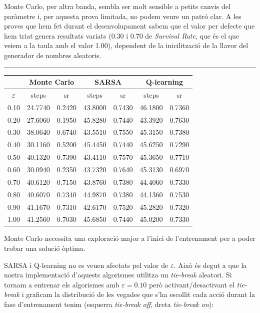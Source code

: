 \documentclass[12pt,a4paper]{report}
\begin{document}
Monte Carlo, per altra banda, sembla ser molt sensible a petits canvis del paràmetre i, per aquesta prova limitada,
no podem veure un patró clar. A les proves que hem fet durant el desenvolupament sabem que el valor per defecte
que hem triat genera resultats variats (0.30 i 0.70 de \textit{Survival Rate}, que és el que veiem a la taula amb el valor 1.00), dependent de la inicilització de la llavor del generador de nombres aleatoris.

\vspace*{10pt}\hrule

\begin{table}[H]
  \centering
  \begin{tabular}{| c | c c | c c | c c |}
    \hline
      & \multicolumn{2}{|c|}{Monte Carlo} & \multicolumn{2}{|c|}{SARSA} & \multicolumn{2}{|c|}{Q-learning} \\
    \hline
    $\varepsilon$ & steps & sr & steps & sr & steps & sr \\
    \hline
    0.10 & 24.7740  & 0.2420 & 43.8000 & 0.7430  & 46.1800 & 0.7360 \\
    0.20 & 27.6060  & 0.1950 & 45.8280 & 0.7440  & 43.3920 & 0.7630 \\
    0.30 & 38.0640  & 0.6740 & 43.5510 & 0.7550  & 45.3150 & 0.7380 \\
    0.40 & 30.1160  & 0.5200 & 45.4450 & 0.7440  & 45.6250 & 0.7290 \\
    0.50 & 40.1320  & 0.7390 & 43.4110 & 0.7570  & 45.3650 & 0.7710 \\
    0.60 & 30.0940  & 0.2350 & 43.7320 & 0.7640  & 45.3130 & 0.6970 \\
    0.70 & 40.6120  & 0.7150 & 43.8760 & 0.7380  & 44.4060 & 0.7330 \\
    0.80 & 40.6070  & 0.7340 & 44.9870 & 0.7380  & 44.1360 & 0.7530 \\
    0.90 & 41.1670  & 0.7310 & 42.6170 & 0.7520  & 45.2820 & 0.7320 \\
    1.00 & 41.2560  & 0.7030 & 45.6850 & 0.7440  & 45.0200 & 0.7330 \\
    \hline
  \end{tabular}
\end{table}

Monte Carlo necessita una exploració major a l'inici de l'entrenament per a poder trobar una solució òptima.

SARSA i Q-learning no es veuen afectats pel valor de $\varepsilon$. Això és degut a que la nostra implementació
d'aquests algorismes utilitza un \textit{tie-break} aleatori. Si tornam a entrenar els algorismes amb $\varepsilon = 0.10$
però activant/desactivant el \textit{tie-break} i graficam la distribució de les vegades que s'ha escollit cada acció
durant la fase d'entrenament tenim (esquerra \textit{tie-break off}, dreta \textit{tie-break on}):
\end{document}
